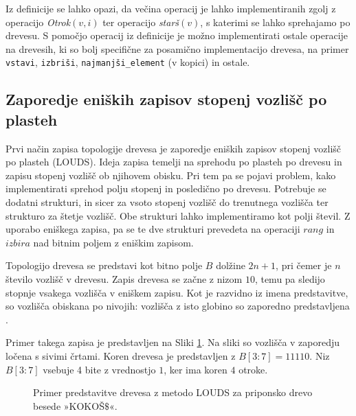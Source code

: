 Iz definicije se lahko opazi, da večina operacij je lahko implementiranih zgolj z operacijo \textit{Otrok}$(v,i)$ ter operacijo \textit{starš}$(v)$, s katerimi se lahko sprehajamo po drevesu. S pomočjo operacij iz definicije je možno implementirati ostale operacije na drevesih, ki so bolj specifične za posamično implementacijo drevesa, na primer \texttt{vstavi}, \texttt{izbriši}, \texttt{najmanjši\_element} (v kopici) in ostale.

\subsection{Zaporedje eniških zapisov stopenj vozlišč po plasteh}\label{sec:LOUDS}

Prvi način zapisa topologije drevesa je zaporedje eniških zapisov stopenj vozlišč po plasteh (LOUDS). Ideja zapisa temelji na sprehodu po plasteh po drevesu in zapisu stopenj vozlišč ob njihovem obisku. Pri tem pa se pojavi problem, kako implementirati sprehod polju stopenj in posledično po drevesu. Potrebuje se dodatni strukturi, in sicer za vsoto stopenj vozlišč do trenutnega vozlišča ter strukturo za štetje vozlišč. Obe strukturi lahko implementiramo kot polji števil. Z uporabo eniškega zapisa, pa se te dve strukturi prevedeta na operaciji $rang$ in $izbira$ nad bitnim poljem z eniškim zapisom.    

Topologijo drevesa se predstavi kot bitno polje $B$ dolžine $2n+1$, pri čemer je $n$ število vozlišč v drevesu. Zapis drevesa se začne z nizom $10$, temu pa sledijo stopnje vsakega vozlišča v eniškem zapisu. Kot je razvidno iz imena predstavitve, so vozlišča obiskana po nivojih: vozlišča z isto globino so zaporedno predstavljena \cite{Navarro2016}.

Primer takega zapisa je predstavljen na Sliki \ref{fig:LOUDS}. Na sliki so vozlišča v zaporedju ločena s sivimi črtami. Koren drevesa je predstavljen z $B[3:7]=11110$. Niz $B[3:7]$ vsebuje 4 bite z vrednostjo $1$, ker ima koren $4$ otroke.

\begin{figure}[htb]
    \begin{center}
        
        \caption{Primer predstavitve drevesa z metodo LOUDS za priponsko drevo besede »KOKOŠ$\$$«.} 
        \label{fig:LOUDS}
    \end{center}
\end{figure}

